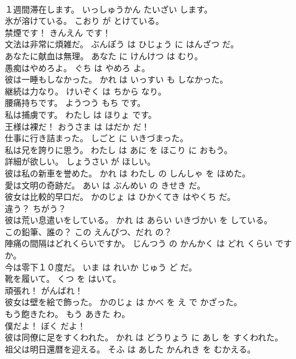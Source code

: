 \documentclass[8pt]{extreport}
\begin{document}
\begin{CJK}{UTF8}{min}
\\	１週間滞在します。	いっしゅうかん たいざい します。	
\\	氷が溶けている。	こおり が とけている。	
\\	禁煙です！	きんえん です！	
\\	文法は非常に煩雑だ。	ぶんぽう は ひじょう に はんざつ だ。	
\\	あなたに献血は無理。	あなた に けんけつ は むり。	
\\	愚痴はやめろよ。	ぐち は やめろ よ。	
\\	彼は一睡もしなかった。	かれ は いっすい も しなかった。	
\\	継続は力なり。	けいぞく は ちから なり。	
\\	腰痛持ちです。	ようつう もち です。	
\\	私は捕虜です。	わたし は ほりょ です。	
\\	王様は裸だ！	おうさま は はだか だ！	
\\	仕事に行き詰まった。	しごと に いきづまった。	
\\	私は兄を誇りに思う。	わたし は あに を ほこり に おもう。	
\\	詳細が欲しい。	しょうさい が ほしい。	
\\	彼は私の新車を誉めた。	かれ は わたし の しんしゃ を ほめた。	
\\	愛は文明の奇跡だ。	あい は ぶんめい の きせき だ。	
\\	彼女は比較的早口だ。	かのじょ は ひかくてき はやくち だ。	
\\	違う？	ちがう？	
\\	彼は荒い息遣いをしている。	かれ は あらい いきづかい を している。	
\\	この鉛筆、誰の？	この えんぴつ、だれ の？	
\\	陣痛の間隔はどれくらいですか。	じんつう の かんかく は どれ くらい です か。	
\\	今は零下１０度だ。	いま は れいか じゅう ど だ。	
\\	靴を履いて。	くつ を はいて。	
\\	頑張れ！	がんばれ！	
\\	彼女は壁を絵で飾った。	かのじょ は かべ を え で かざった。	
\\	もう飽きたわ。	もう あきた わ。	
\\	僕だよ！	ぼく だよ！	
\\	彼は同僚に足をすくわれた。	かれ は どうりょう に あし を すくわれた。	
\\	祖父は明日還暦を迎える。	そふ は あした かんれき を むかえる。	

\end{CJK}
\end{document}
